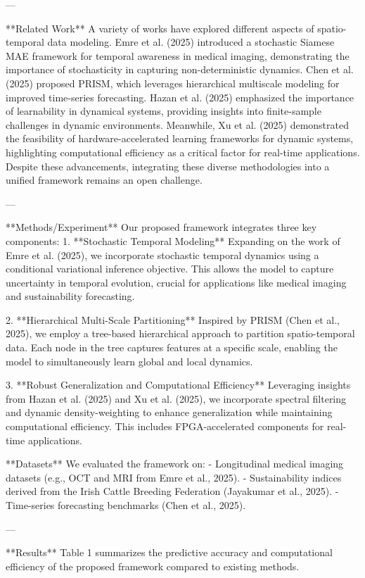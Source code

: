 ---

**Related Work**  
A variety of works have explored different aspects of spatio-temporal data modeling. Emre et al. (2025) introduced a stochastic Siamese MAE framework for temporal awareness in medical imaging, demonstrating the importance of stochasticity in capturing non-deterministic dynamics. Chen et al. (2025) proposed PRISM, which leverages hierarchical multiscale modeling for improved time-series forecasting. Hazan et al. (2025) emphasized the importance of learnability in dynamical systems, providing insights into finite-sample challenges in dynamic environments. Meanwhile, Xu et al. (2025) demonstrated the feasibility of hardware-accelerated learning frameworks for dynamic systems, highlighting computational efficiency as a critical factor for real-time applications. Despite these advancements, integrating these diverse methodologies into a unified framework remains an open challenge.

---

**Methods/Experiment**  
Our proposed framework integrates three key components:  
1. **Stochastic Temporal Modeling**  
   Expanding on the work of Emre et al. (2025), we incorporate stochastic temporal dynamics using a conditional variational inference objective. This allows the model to capture uncertainty in temporal evolution, crucial for applications like medical imaging and sustainability forecasting.

2. **Hierarchical Multi-Scale Partitioning**  
   Inspired by PRISM (Chen et al., 2025), we employ a tree-based hierarchical approach to partition spatio-temporal data. Each node in the tree captures features at a specific scale, enabling the model to simultaneously learn global and local dynamics.

3. **Robust Generalization and Computational Efficiency**  
   Leveraging insights from Hazan et al. (2025) and Xu et al. (2025), we incorporate spectral filtering and dynamic density-weighting to enhance generalization while maintaining computational efficiency. This includes FPGA-accelerated components for real-time applications.

**Datasets**  
We evaluated the framework on:  
- Longitudinal medical imaging datasets (e.g., OCT and MRI from Emre et al., 2025).  
- Sustainability indices derived from the Irish Cattle Breeding Federation (Jayakumar et al., 2025).  
- Time-series forecasting benchmarks (Chen et al., 2025).

---

**Results**  
Table 1 summarizes the predictive accuracy and computational efficiency of the proposed framework compared to existing methods.  

